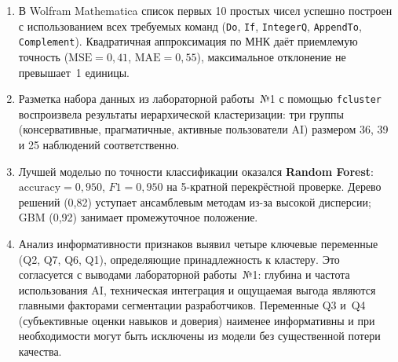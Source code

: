 \documentclass[12pt]{article}
\begin{document}
\begin{enumerate}
  \item В Wolfram Mathematica список первых 10 простых чисел успешно построен
    с использованием всех требуемых команд (\texttt{Do}, \texttt{If},
    \texttt{IntegerQ}, \texttt{AppendTo}, \texttt{Complement}).
    Квадратичная аппроксимация по МНК даёт приемлемую точность
    ($\text{MSE}=0{,}41$, $\text{MAE}=0{,}55$), максимальное отклонение не
    превышает~1 единицы.

  \item Разметка набора данных из лабораторной работы~№1 с помощью
    \texttt{fcluster} воспроизвела результаты иерархической кластеризации:
    три группы (консервативные, прагматичные, активные пользователи AI)
    размером 36, 39 и 25 наблюдений соответственно.

  \item Лучшей моделью по точности классификации оказался \textbf{Random
    Forest}: $\text{accuracy} = 0{,}950$, $F1 = 0{,}950$ на 5-кратной
    перекрёстной проверке.  Дерево решений (0{,}82) уступает ансамблевым
    методам из-за высокой дисперсии; GBM (0{,}92) занимает промежуточное
    положение.

  \item Анализ информативности признаков выявил четыре ключевые переменные
    (Q2, Q7, Q6, Q1), определяющие принадлежность к кластеру.  Это
    согласуется с выводами лабораторной работы~№1: глубина и частота
    использования AI, техническая интеграция и ощущаемая выгода являются
    главными факторами сегментации разработчиков.  Переменные Q3 и~Q4
    (субъективные оценки навыков и доверия) наименее информативны и при
    необходимости могут быть исключены из модели без существенной потери
    качества.
\end{enumerate}
\end{document}
